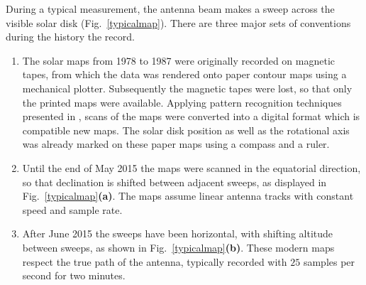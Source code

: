 \documentclass{aa}
\begin{document}
  During a typical measurement, the antenna beam makes a sweep across the
  visible solar disk (Fig.~\ref{typicalmap}). There are three major sets of conventions during the history the record.
  \begin{enumerate}[A]
    \item
    The solar maps from 1978 to 1987 were originally recorded on magnetic
    tapes, from which the data was rendered onto paper contour maps using a
    mechanical plotter.
    Subsequently the magnetic tapes were lost, so that only the printed maps
    were available. Applying pattern recognition techniques presented in \cite{masterthesis}, scans of the maps were converted into
    a digital format which is compatible new maps.
    The solar disk position as well as the rotational axis was already marked on these paper maps using a compass and a ruler.
    \item
    Until the end of May 2015 the maps were scanned in the equatorial direction,
    so that declination is shifted between adjacent sweeps, as displayed in
    Fig.~\ref{typicalmap}{\bf(a)}.
    The maps assume linear antenna tracks with constant speed and sample rate.
    \item
    After June 2015 the sweeps have been horizontal, with shifting altitude
    between sweeps, as shown in Fig.~\ref{typicalmap}{\bf(b)}.
    These modern maps respect the true path of the antenna, typically recorded
    with $25$ samples per second for two minutes.
  \end{enumerate}
\end{document}
